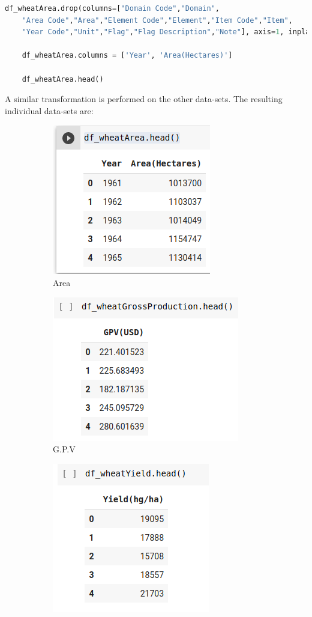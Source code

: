 \documentclass[
]{thesis-ekf}
\begin{document}
\begin{lstlisting}[language=Python]
	df_wheatArea.drop(columns=["Domain Code","Domain",
	"Area Code","Area","Element Code","Element","Item Code","Item",
	"Year Code","Unit","Flag","Flag Description","Note"], axis=1, inplace=True)
	
	df_wheatArea.columns = ['Year', 'Area(Hectares)'] 
	
	df_wheatArea.head()
\end{lstlisting}

A similar transformation is performed on the other data-sets. The resulting individual data-sets are: 
\begin{figure}
	\centering
	\begin{subfigure}{.25\textwidth}
		\centering
		\includegraphics[width=.4\linewidth]{fig/areaHectares.png}
		\caption{Area}
		\label{fig:sub1}
	\end{subfigure}%
	\begin{subfigure}{.24\textwidth}
		\centering
		\includegraphics[width=.4\linewidth]{fig/gpv.png}
		\caption{G.P.V}
		\label{fig:sub2}
	\end{subfigure}
	\begin{subfigure}{.25\textwidth}
		\centering
		\includegraphics[width=.4\linewidth]{fig/yield.png}

\end{subfigure}
\end{figure}
\end{document}
